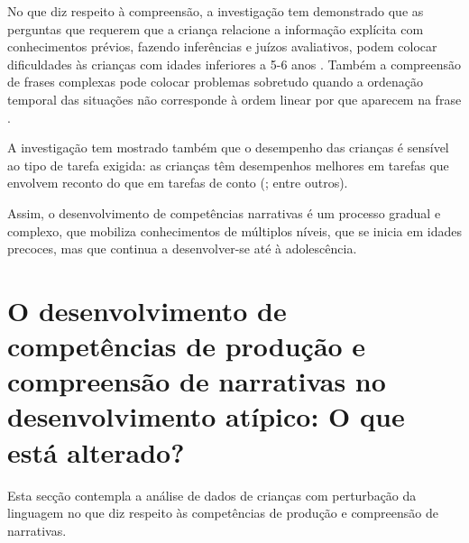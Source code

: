 \documentclass[output=paper,colorlinks,citecolor=brown,booklanguage=portuguese]{langscibook}
\begin{document}
No que diz respeito à compreensão, a investigação tem demonstrado que as perguntas que requerem que a criança relacione a informação explícita com conhecimentos prévios, fazendo inferências e juízos avaliativos, podem colocar dificuldades às crianças com idades inferiores a 5-6 anos \citep{Dawes2017}. Também a compreensão de frases complexas pode colocar problemas sobretudo quando a ordenação temporal das situações não corresponde à ordem linear por que aparecem na frase \citep{Goncalves2011a}.

A investigação tem mostrado também que o desempenho das crianças é sensível ao tipo de tarefa exigida: as crianças têm desempenhos melhores em tarefas que envolvem reconto do que em tarefas de conto (\citealp{Nippold2005, Cavalcante2010, Andrade2017, Balciuniene2016, Vaz2020}; entre outros).

Assim, o desenvolvimento de competências narrativas é um processo gradual e complexo, que mobiliza conhecimentos de múltiplos níveis, que se inicia em idades precoces, mas que continua a desenvolver-se até à adolescência.

\section{O desenvolvimento de competências de produção e compreensão de narrativas no desenvolvimento atípico: O que está alterado?}\label{sec:seiscap16} Esta secção contempla a análise de dados de crianças com perturbação da linguagem no que diz respeito às competências de produção e compreensão de narrativas.
\end{document}
